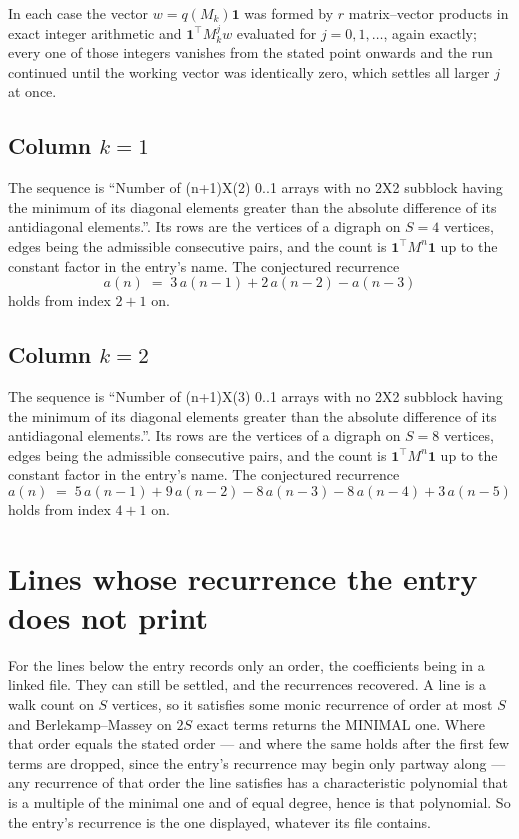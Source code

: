 \documentclass[11pt,a4paper]{article}
\theoremstyle{plain}
\theoremstyle{definition}
\begin{document}
In each case the vector $w=q(M_k)\mathbf{1}$ was formed by $r$ matrix--vector products in
exact integer arithmetic and $\mathbf{1}^{\!\top}M_k^{j}w$ evaluated for $j=0,1,\dots$,
again exactly; every one of those integers vanishes from the stated point onwards and the run
continued until the working vector was identically zero, which settles all larger $j$ at once.

\subsection*{Column $k$$=1$}
The sequence is ``Number of (n+1)X(2) 0..1 arrays with no 2X2 subblock having the minimum of its diagonal elements greater than the absolute difference of its antidiagonal elements.''. Its rows are the vertices of a digraph on
$S=4$ vertices, edges being the admissible consecutive pairs, and the count is
$\mathbf{1}^{\!\top}M^{n}\mathbf{1}$ up to the constant factor in the entry's name.
The conjectured recurrence
\[
a(n)\;=\;3\,a(n-1) + 2\,a(n-2) - a(n-3)
\]
holds from index $2+1$ on.

\subsection*{Column $k$$=2$}
The sequence is ``Number of (n+1)X(3) 0..1 arrays with no 2X2 subblock having the minimum of its diagonal elements greater than the absolute difference of its antidiagonal elements.''. Its rows are the vertices of a digraph on
$S=8$ vertices, edges being the admissible consecutive pairs, and the count is
$\mathbf{1}^{\!\top}M^{n}\mathbf{1}$ up to the constant factor in the entry's name.
The conjectured recurrence
\[
a(n)\;=\;5\,a(n-1) + 9\,a(n-2) - 8\,a(n-3) - 8\,a(n-4) + 3\,a(n-5)
\]
holds from index $4+1$ on.


\section{Lines whose recurrence the entry does not print}

For the lines below the entry records only an order, the coefficients being in a linked file.
They can still be settled, and the recurrences recovered. A line is a walk count on $S$
vertices, so it satisfies some monic recurrence of order at most $S$ and Berlekamp--Massey on
$2S$ exact terms returns the MINIMAL one. Where that order equals the stated order --- and
where the same holds after the first few terms are dropped, since the entry's recurrence may
begin only partway along --- any recurrence of that order the line satisfies has a
characteristic polynomial that is a multiple of the minimal one and of equal degree, hence is
that polynomial. So the entry's recurrence is the one displayed, whatever its file contains.
\end{document}
